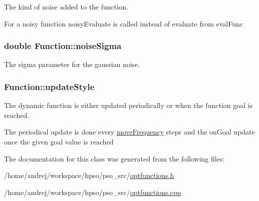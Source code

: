 The kind of noise added to the function. 

For a noisy function noisyEvaluate is called instead of evaluate from evalFunc \hypertarget{classFunction_a2192bf028cf97293a9ae6863a909caf}{
\subsubsection{\setlength{\rightskip}{0pt plus 5cm}double {\bf Function::noiseSigma}}}
\label{classFunction_a2192bf028cf97293a9ae6863a909caf}


The sigma parameter for the gaussian noise. 

\hypertarget{classFunction_fc687e3f2c1ee87897c5bf22aeb11ab6}{
\subsubsection{ {\bf Function::updateStyle}}}
\label{classFunction_fc687e3f2c1ee87897c5bf22aeb11ab6}


The dynamic function is either updated periodically or when the function goal is reached. 

The periodical update is done every \hyperlink{classFunction_323cbb2de44582df3b9981e6c3416980}{moveFrequency} steps and the onGoal update once the given goal value is reached 

The documentation for this class was generated from the following files:\begin{CompactItemize}
\item 
/home/andrej/workspace/hpso/pso\_\-src/\hyperlink{optfunctions_8h}{optfunctions.h}\item 
/home/andrej/workspace/hpso/pso\_\-src/\hyperlink{optfunctions_8cpp}{optfunctions.cpp}\end{CompactItemize}

